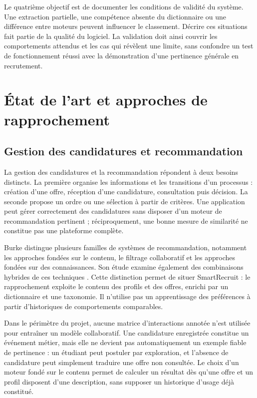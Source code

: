 Le quatrième objectif est de documenter les conditions de validité du système. Une extraction partielle, une compétence absente du dictionnaire ou une différence entre moteurs peuvent influencer le classement. Décrire ces situations fait partie de la qualité du logiciel. La validation doit ainsi couvrir les comportements attendus et les cas qui révèlent une limite, sans confondre un test de fonctionnement réussi avec la démonstration d'une pertinence générale en recrutement.

\section{État de l'art et approches de rapprochement}

\subsection{Gestion des candidatures et recommandation}

La gestion des candidatures et la recommandation répondent à deux besoins distincts. La première organise les informations et les transitions d'un processus : création d'une offre, réception d'une candidature, consultation puis décision. La seconde propose un ordre ou une sélection à partir de critères. Une application peut gérer correctement des candidatures sans disposer d'un moteur de recommandation pertinent ; réciproquement, une bonne mesure de similarité ne constitue pas une plateforme complète.

Burke distingue plusieurs familles de systèmes de recommandation, notamment les approches fondées sur le contenu, le filtrage collaboratif et les approches fondées sur des connaissances. Son étude examine également des combinaisons hybrides de ces techniques \cite{burke2002}. Cette distinction permet de situer SmartRecruit : le rapprochement exploite le contenu des profils et des offres, enrichi par un dictionnaire et une taxonomie. Il n'utilise pas un apprentissage des préférences à partir d'historiques de comportements comparables.

Dans le périmètre du projet, aucune matrice d'interactions annotée n'est utilisée pour entraîner un modèle collaboratif. Une candidature enregistrée constitue un événement métier, mais elle ne devient pas automatiquement un exemple fiable de pertinence : un étudiant peut postuler par exploration, et l'absence de candidature peut simplement traduire une offre non consultée. Le choix d'un moteur fondé sur le contenu permet de calculer un résultat dès qu'une offre et un profil disposent d'une description, sans supposer un historique d'usage déjà constitué.


